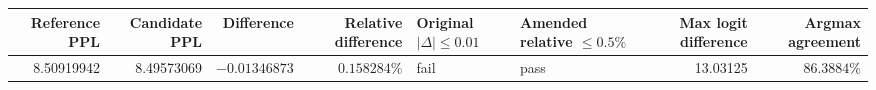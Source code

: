\begin{tabular}{rrrrllrr}
\toprule
Reference PPL & Candidate PPL & Difference & Relative difference & Original $|\Delta|\leq0.01$ & Amended relative $\leq0.5\%$ & Max logit difference & Argmax agreement \\
\midrule
8.50919942 & 8.49573069 & $-0.01346873$ & $0.158284\%$ & fail & pass & 13.03125 & $86.3884\%$ \\
\bottomrule
\end{tabular}
